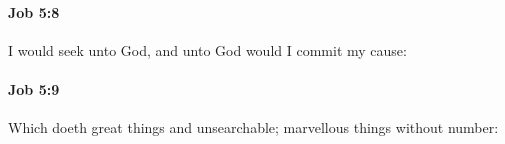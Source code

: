 		\paragraph{Job 5:8} %
			\label{JOB-5-8}

			I would seek unto God, and unto God would I commit my cause:


		\paragraph{Job 5:9} %
			\label{JOB-5-9}

			Which doeth great things and unsearchable; marvellous things without number:


